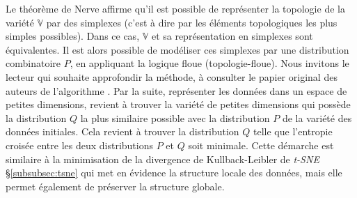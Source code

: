 Le théorème de Nerve affirme qu'il est possible de représenter la topologie de la variété $\mathbb{V}$ par des simplexes (c'est à dire par les éléments topologiques les plus simples possibles).
Dans ce cas, $\mathbb{V}$ et sa représentation en simplexes sont équivalentes.
Il est alors possible de modéliser ces simplexes par une distribution combinatoire $P$, en appliquant la logique floue (topologie-floue).
Nous invitons le lecteur qui souhaite approfondir la méthode, à consulter le papier original des auteurs de l'algorithme \cite{mcinnes_umap_2018}.
Par la suite, représenter les données dans un espace de petites dimensions, revient à trouver la variété de petites dimensions qui possède la distribution $Q$ la plus similaire possible avec la distribution $P$ de la variété des données initiales.
Cela revient à trouver la distribution $Q$ telle que l'entropie croisée entre les deux distributions $P$ et $Q$ soit minimale.
Cette démarche est similaire à la minimisation de la divergence de Kullback-Leibler de \textit{t-SNE} §\ref{subsubsec:tsne} qui met en évidence la structure locale des données, mais elle permet également de préserver la structure globale.


